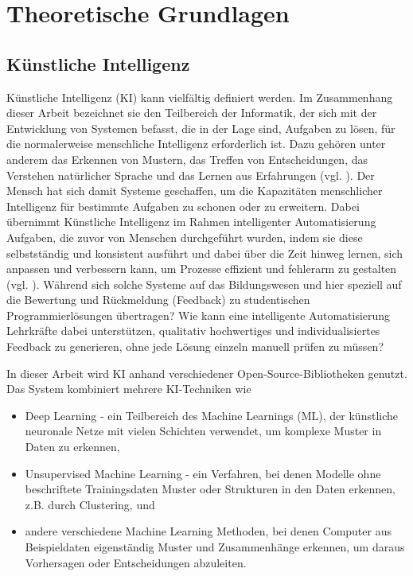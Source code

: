 \chapter{Theoretische Grundlagen}

\section{Künstliche Intelligenz}
Künstliche Intelligenz (KI) kann vielfältig definiert werden. Im Zusammenhang dieser Arbeit bezeichnet sie den Teilbereich der Informatik, der sich mit der Entwicklung von Systemen befasst, die in der Lage sind, Aufgaben zu lösen, für die normalerweise menschliche Intelligenz erforderlich ist. Dazu gehören unter anderem das Erkennen von Mustern, das Treffen von Entscheidungen, das Verstehen natürlicher Sprache und das Lernen aus Erfahrungen (vgl. \cite{Bartneck.2021}). Der Mensch hat sich damit Systeme geschaffen, um die Kapazitäten menschlicher Intelligenz für bestimmte Aufgaben zu schonen oder zu erweitern. Dabei übernimmt Künstliche Intelligenz im Rahmen intelligenter Automatisierung Aufgaben, die zuvor von Menschen durchgeführt wurden, indem sie diese selbstständig und konsistent ausführt und dabei über die Zeit hinweg lernen, sich anpassen und verbessern kann, um Prozesse effizient und fehlerarm zu gestalten (vgl. \cite{Coombs.2020}). Während sich solche Systeme auf das Bildungswesen und hier speziell auf die Bewertung und Rückmeldung (Feedback) zu studentischen Programmierlösungen übertragen? Wie kann eine intelligente Automatisierung Lehrkräfte dabei unterstützen, qualitativ hochwertiges und individualisiertes Feedback zu generieren, ohne jede Lösung einzeln manuell prüfen zu müssen?

In dieser Arbeit wird KI anhand verschiedener Open-Source-Bibliotheken genutzt. Das System kombiniert mehrere KI-Techniken wie
\begin{itemize}
    \item Deep Learning - ein Teilbereich des Machine Learnings (ML), der künstliche neuronale Netze mit vielen Schichten verwendet, um komplexe Muster in Daten zu erkennen,
    \item Unsupervised Machine Learning - ein Verfahren, bei denen Modelle ohne beschriftete Trainingsdaten Muster oder Strukturen in den Daten erkennen, z.B. durch Clustering, und
    \item andere verschiedene Machine Learning Methoden, bei denen Computer aus Beispieldaten eigenständig Muster und Zusammenhänge erkennen, um daraus Vorhersagen oder Entscheidungen abzuleiten.
\end{itemize}

